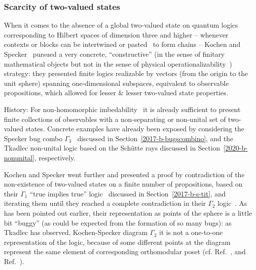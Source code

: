 




\subsubsection{Scarcity of two-valued states}

When it comes to the absence of a global two-valued state on quantum logics corresponding to Hilbert
spaces of dimension three and higher -- whenever contexts or blocks can be intertwined or pasted~\cite{nav:91} to form chains --
Kochen and Specker~\cite{kochen1} pursued a very concrete, ``constructive''
(in the sense of finitary mathematical objects but not in the sense of physical operationalizability~\cite{bridgman})
strategy: they presented finite logics realizable by vectors (from the origin to the unit sphere) spanning one-dimensional subspaces, equivalent
to observable propositions, which allowed for lesser \& lesser two-valued state properties.

History:
For non-homomorphic imbedability~\cite[Theorem~0]{kochen1} it is already sufficient to present finite collections of observables with a non-separating
or non-unital set of two-valued states.
Concrete examples have already been exposed by considering the Specker bug combo $\Gamma_3$~\cite[p.~70]{kochen1}
discussed in Section~\ref{2017-b-bugscombino},
and the Tkadlec non-unital logic based on the Sch\"utte rays
discussed in Section~\ref{2020-b-nonunital}, respectively.

Kochen and Specker went further and presented a  proof by contradiction
of the non-existence of two-valued states on a finite number of propositions,
based on their  $\Gamma_1$ ``true implies true'' logic~\cite[p.~68]{kochen1} discussed in Section~\ref{2017-b-s-tit},
and iterating them until they reached a complete contradiction in their $\Gamma_2$ logic~\cite[p.~69]{kochen1}.
As has been pointed out earlier, their representation as points of the sphere is a little bit ``buggy'' (as could be expected from the formation of so many bugs):
as Tkadlec has observed, Kochen-Specker diagram $\Gamma_2$ it is not a one-to-one representation of the logic, because of some different points
at the diagram represent the same element of corresponding orthomodular
poset (cf. Ref.~\cite[p.~5390]{svozil-tkadlec}, and Ref.~\cite[p.]{tkadlec-01}).


